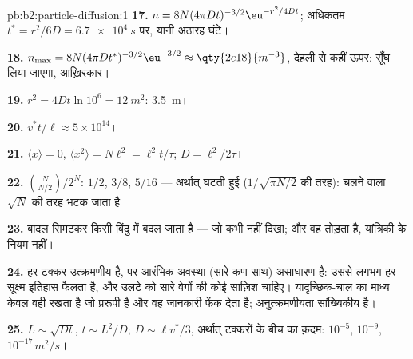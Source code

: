 \begin{solution}{pb:b2:particle-diffusion:1}
\textbf{17.} $n = 8N(4\pi Dt)^{-3/2}\eu^{-r^2/4Dt}$; अधिकतम $t^* = r^2/6D =
\qty{6.7e4}{s}$ पर, यानी अठारह घंटे।

\textbf{18.} $n_{\max} = 8N(4\pi Dt^*)^{-3/2}\eu^{-3/2} \approx \qty{2e18}{m^{-3}}$,
देहली से कहीं ऊपर: सूँघ लिया जाएगा, आख़िरकार।

\textbf{19.} $r^2 = 4Dt\ln 10^6 = \qty{12}{m^2}$: \qty{3.5}{m}।

\textbf{20.} $v^*t/\ell \approx 5 \times 10^{14}$।

\textbf{21.} $\langle x\rangle = 0$, $\langle x^2\rangle = N\ell^2 = \ell^2 t/\tau$;
$D = \ell^2/2\tau$।

\textbf{22.} $\binom{N}{N/2}/2^N$: $1/2$, $3/8$, $5/16$ --- अर्थात् घटती हुई
($1/\sqrt{\pi N/2}$ की तरह): चलने वाला $\sqrt N$ की तरह भटक जाता है।

\textbf{23.} बादल सिमटकर किसी बिंदु में बदल जाता है --- जो कभी नहीं दिखा; और वह
 तोड़ता है, यांत्रिकी के नियम नहीं।

\textbf{24.} हर टक्कर उत्क्रमणीय है, पर आरंभिक अवस्था (सारे
कण साथ) असाधारण है: उससे लगभग हर सूक्ष्म इतिहास
फैलता है, और उलटे को सारे वेगों की कोई साज़िश चाहिए।
यादृच्छिक-चाल का माध्य केवल वही रखता है जो प्ररूपी है और
वह जानकारी फेंक देता है; अनुत्क्रमणीयता सांख्यिकीय है।

\textbf{25.} $L \sim \sqrt{Dt}$, $t \sim L^2/D$; $D \sim \ell v^*/3$, अर्थात्
टक्करों के बीच का क़दम: $10^{-5}$, $10^{-9}$, $10^{-17}\,\unit{m^2/s}$।
\end{solution}
